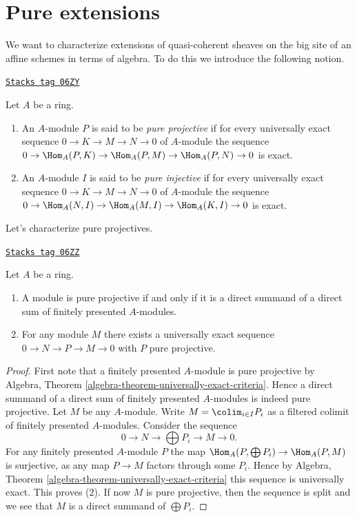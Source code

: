 \section{Pure extensions}
\label{adequate-section-pure}
We want to characterize extensions of quasi-coherent sheaves on
the big site of an affine schemes in terms of algebra. To do this
we introduce the following notion.

\begin{definition}[Pure]
\label{adequate-definition-pure}
\href{https://stacks.math.columbia.edu/tag/06ZY}{\texttt{Stacks tag 06ZY}}

Let $A$ be a ring.
\begin{enumerate}
\item An $A$-module $P$ is said to be {\it pure projective}
if for every universally exact sequence
$0 \to K \to M \to N \to 0$ of $A$-module the sequence
$0 \to \Hom_A(P, K) \to \Hom_A(P, M) \to \Hom_A(P, N) \to 0$
is exact.
\item An $A$-module $I$ is said to be {\it pure injective}
if for every universally exact sequence
$0 \to K \to M \to N \to 0$ of $A$-module the sequence
$0 \to \Hom_A(N, I) \to \Hom_A(M, I) \to \Hom_A(K, I) \to 0$
is exact.
\end{enumerate}
\end{definition}

Let's characterize pure projectives.

\begin{lemma}
\label{adequate-lemma-pure-projective}
\href{https://stacks.math.columbia.edu/tag/06ZZ}{\texttt{Stacks tag 06ZZ}}

Let $A$ be a ring.
\begin{enumerate}
\item A module is pure projective if and only if
it is a direct summand of a direct sum of finitely presented $A$-modules.
\item For any module $M$ there exists a universally exact sequence
$0 \to N \to P \to M \to 0$ with $P$ pure projective.
\end{enumerate}
\end{lemma}

\begin{proof}
First note that a finitely presented $A$-module is pure projective by
Algebra, Theorem \ref{algebra-theorem-universally-exact-criteria}.
Hence a direct summand of a direct sum of finitely presented $A$-modules
is indeed pure projective. Let $M$ be any $A$-module.
Write $M = \colim_{i \in I} P_i$ as a filtered colimit of
finitely presented $A$-modules. Consider the sequence
$$
0 \to N \to \bigoplus P_i \to M \to 0.
$$
For any finitely presented $A$-module $P$ the map
$\Hom_A(P, \bigoplus P_i) \to \Hom_A(P, M)$
is surjective, as any map $P \to M$ factors through some $P_i$.
Hence by
Algebra, Theorem \ref{algebra-theorem-universally-exact-criteria}
this sequence is universally exact. This proves (2).
If now $M$ is pure projective, then the sequence is split and
we see that $M$ is a direct summand of $\bigoplus P_i$.
\end{proof}

